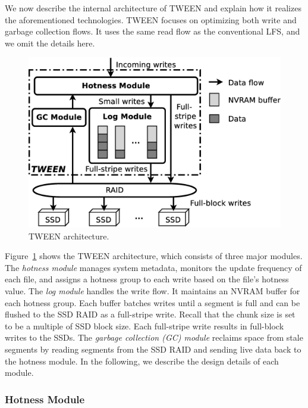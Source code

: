 We now describe the internal architecture of TWEEN and explain how it
realizes the aforementioned technologies.  TWEEN focuses on optimizing both
write and garbage collection flows.  It uses the same read flow as the
conventional LFS, and we omit the details here. 

\begin{figure}[t]
    \includegraphics[width=0.99\linewidth]{figs/ssdraid_arch_2}
    \caption{TWEEN architecture.}
    \label{fig:architecture}
\end{figure}

Figure~\ref{fig:architecture} shows the TWEEN architecture, which consists of
three major modules. The \textit{hotness module} manages system metadata,
monitors the update frequency of each file, and assigns a hotness group to
each write based on the file's hotness value.  The \textit{log module} handles
the write flow.  It maintains an NVRAM buffer for each hotness group. Each
buffer batches writes until a segment is full and can be flushed to the
SSD RAID as a full-stripe write. Recall that the chunk size is set to be 
a multiple of SSD block size. Each full-stripe write results in full-block writes to the
SSDs.  The \textit{garbage collection (GC) module} reclaims space 
from stale segments by reading segments from the SSD
RAID and sending live data back to the hotness module. In the following, we describe the
design details of each module. 

\subsubsection{Hotness Module}
\label{subsubsec:hotmod}


